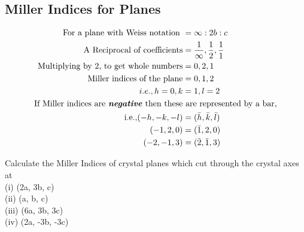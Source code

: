 \subsection{Miller Indices for Planes}
\begin{align*}
\text{For a plane with Weiss notation }	 &= \infty : 2b: c\\
\text{ A Reciprocal of coefficients} &=\frac{1}{\infty}, \frac{1}{2}, \frac{1}{1}\\
\text{ Multiplying by 2, to get whole numbers} &= 0, 2, 1\\
\text{Miller indices of the plane} &=0,1,2\\
i.e., h= 0, k&= 1, l= 2\\
\text{If Miller indices are \textbf{\textit{negative}} then these}&\text{  are represented by a bar,}\\
\text{i.e.,}(-h, -k, -l) &= (\bar{h}, \bar{k}, \bar{l})\\
 (-1, 2, 0) &= (\bar{1}, 2, 0)\\
(-2, -1, 3) &= (\bar{2}, \bar{1}, 3)
\end{align*}
\begin{exercise}
	Calculate the Miller Indices of crystal planes which cut through the crystal axes at \\
	(i) (2a, 3b, c)\\
	(ii) (a, b, c)\\
	(iii) (6a, 3b, 3c)\\
	(iv) (2a, -3b, -3c)
\end{exercise}	
